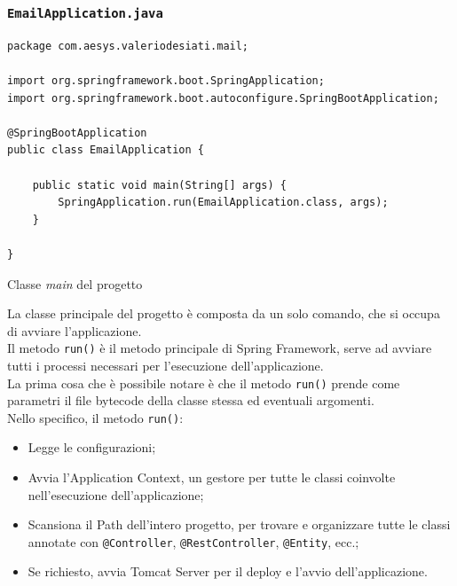 \subsubsection{\texttt{EmailApplication.java}}
\begin{algorithm}
\centering
\begin{verbatim}
package com.aesys.valeriodesiati.mail;

import org.springframework.boot.SpringApplication;
import org.springframework.boot.autoconfigure.SpringBootApplication;

@SpringBootApplication
public class EmailApplication {
    
    public static void main(String[] args) {
        SpringApplication.run(EmailApplication.class, args);
    }

}
\end{verbatim}
\caption{Classe \emph{main} del progetto}\label{alg:emailapplication}
\end{algorithm}

La classe principale del progetto è composta da un solo comando, che si occupa di avviare l'applicazione.\\
Il metodo \texttt{run()} è il metodo principale di Spring Framework, serve ad avviare tutti i processi necessari per l'esecuzione dell'applicazione.\\
La prima cosa che è possibile notare è che il metodo \texttt{run()} prende come parametri il file bytecode della classe stessa ed eventuali argomenti.\\
Nello specifico, il metodo \texttt{run()}:
\begin{itemize}
\item Legge le configurazioni;
\item Avvia l'Application Context, un gestore per tutte le classi coinvolte nell'esecuzione dell'applicazione;
\item Scansiona il Path dell'intero progetto, per trovare e organizzare tutte le classi annotate con \texttt{@Controller}, \texttt{@RestController}, \texttt{@Entity}, ecc.;
\item Se richiesto, avvia Tomcat Server per il deploy e l'avvio dell'applicazione.
\end{itemize}
\newpage
